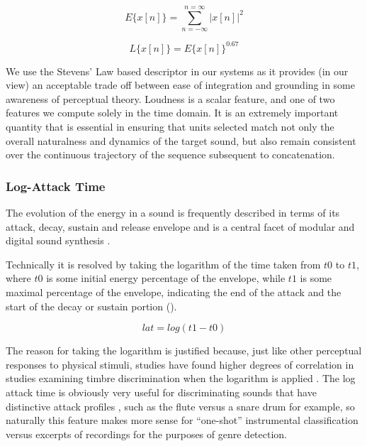 {{\begin{equation}
\label{eq:energy}
E\{x[n]\}= \sum_{n=-\infty}^{n=\infty}|x[n]|^{2}
\end{equation}

\begin{equation}
\label{eq:stevens_loudness}
L\{x[n]\}= E\{x[n]\}^{0.67}
\end{equation}

We use the Stevens' Law based descriptor in our systems as it provides (in our view) an acceptable trade off between ease of integration and grounding in some awareness of perceptual theory. Loudness is a scalar feature, and one of two features we compute solely in the time domain. It is an extremely important quantity that is essential in ensuring that units selected match not only the overall naturalness and dynamics of the target sound, but also remain consistent over the continuous trajectory of the sequence subsequent to concatenation. 

\subsubsection{Log-Attack Time}

The evolution of the energy in a sound is frequently described in terms of its attack, decay, sustain and release envelope \citep{Peeters2004b, Kim2006, Brossier2004a} and is a central facet of modular and digital sound synthesis \citep{Russ2004}. 

Technically it is resolved by taking the logarithm of the time taken from $t0$ to $t1$, where $t0$ is some initial energy percentage of the envelope, while $t1$ is some maximal percentage of the envelope, indicating the end of the attack and the start of the decay or sustain portion ().

\begin{equation}
\label{eq:lat}
lat = log(t1-t0)
\end{equation}

The reason for taking the logarithm is justified because, just like other perceptual responses to physical stimuli, studies have found higher degrees of correlation in studies examining timbre discrimination when the logarithm is applied \citep{McAdams1995, McAdams1999, Agres2016}. The log attack time is obviously very useful for discriminating sounds that have distinctive attack profiles \citep{Herrera-Boyer2003}, such as the flute versus a snare drum for example, so naturally this feature makes more sense for ``one-shot'' instrumental classification versus excerpts of recordings for the purposes of genre detection.

}}
